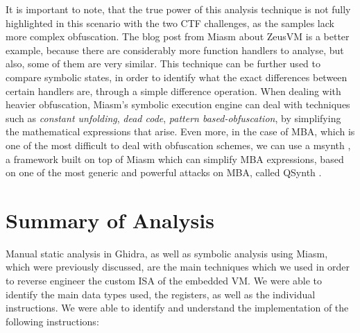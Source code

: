 It is important to note, that the true power of this analysis technique is not fully highlighted in this scenario with the two \gls{CTF} challenges, as the samples lack more complex obfuscation. The blog post from Miasm about ZeusVM \cite{zeusvm_miasm} is a better example, because there are considerably more function handlers to analyse, but also, some of them are very similar. This technique can be further used to compare symbolic states, in order to identify what the exact differences between certain handlers are, through a simple difference operation. When dealing with heavier obfuscation, Miasm's symbolic execution engine can deal with techniques such as \emph{constant unfolding}, \emph{dead code}, \emph{pattern based-obfuscation}, by simplifying the mathematical expressions that arise. Even more, in the case of \gls{MBA}, which is one of the most difficult to deal with obfuscation schemes, we can use a msynth \cite{msynth}, a framework built on top of Miasm which can simplify \gls{MBA} expressions, based on one of the most generic and powerful attacks on \gls{MBA}, called QSynth \cite{qsynth}.

\section{Summary of Analysis}

Manual static analysis in Ghidra, as well as symbolic analysis using Miasm, which were previously discussed, are the main techniques which we used in order to reverse engineer the custom \gls{ISA} of the embedded \gls{VM}. We were able to identify the main data types used, the registers, as well as the individual instructions. We were able to identify and understand the implementation of the following instructions: 

